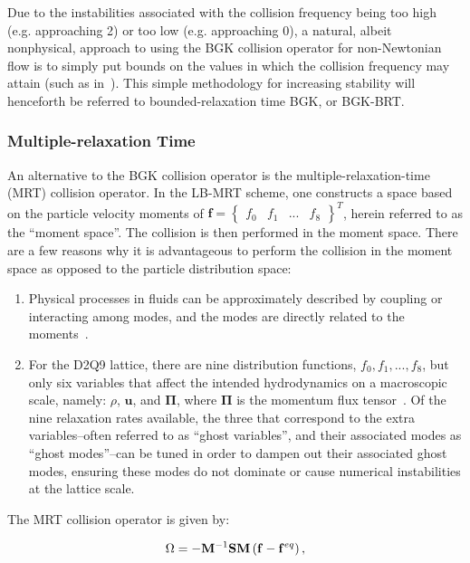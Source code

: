 Due to the instabilities associated with the collision frequency being too high (e.g. approaching 2) or too low (e.g. approaching 0), a natural, albeit nonphysical, approach to using the BGK collision operator for non-Newtonian flow is to simply put bounds on the values in which the collision frequency may attain (such as in~\citet{svec2011flow,svec2012free,gabbanelli2005lattice}).
This simple methodology for increasing stability will henceforth be referred to bounded-relaxation time BGK, or BGK-BRT.

\subsubsection{Multiple-relaxation Time} \label{sec:mrt}

An alternative to the BGK collision operator is the multiple-relaxation-time (MRT) collision operator.
In the LB-MRT scheme, one constructs a space based on the particle velocity moments of $\mathbf{f} = \begin{Bmatrix}f_0 & f_1 & ... & f_8\end{Bmatrix}^T$, herein referred to as the ``moment space''.
The collision is then performed in the moment space.
There are a few reasons why it is advantageous to perform the collision in the moment space as opposed to the particle distribution space:
\begin{enumerate}
    \item Physical processes in fluids can be approximately described by coupling or interacting among modes, and the modes are directly related to the moments~\cite{lallemand2000theory}.
    \item For the D2Q9 lattice, there are nine distribution functions, $f_0, f_1, ..., f_8$, but only six variables that affect the intended hydrodynamics on a macroscopic scale, namely: $\rho$, $\mathbf{u}$, and $\mathbf{\Pi}$, where $\mathbf{\Pi}$ is the momentum flux tensor~\cite{dellar2003incompressible}.
    Of the nine relaxation rates available, the three that correspond to the extra variables--often referred to as ``ghost variables'', and their associated modes as ``ghost modes''--can be tuned in order to dampen out their associated ghost modes, ensuring these modes do not dominate or cause numerical instabilities at the lattice scale.
\end{enumerate}

The MRT collision operator is given by:

\begin{equation} \label{eq:mrt-colop}
	\Omega = - {\mathbf{M}}^{-1} \mathbf{S} \mathbf{M} \left(\mathbf{f} - \mathbf{f}^{eq}\right),
\end{equation}

